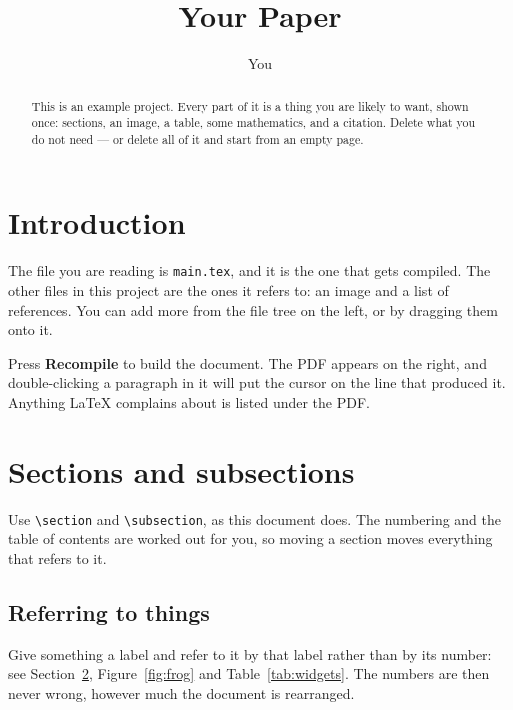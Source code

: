 \documentclass{article}
\title{Your Paper}
\author{You}
\begin{document}
\maketitle

\begin{abstract}
This is an example project. Every part of it is a thing you are likely to
want, shown once: sections, an image, a table, some mathematics, and a
citation. Delete what you do not need --- or delete all of it and start from
an empty page.
\end{abstract}

\section{Introduction}

The file you are reading is \verb|main.tex|, and it is the one that gets
compiled. The other files in this project are the ones it refers to: an image
and a list of references. You can add more from the file tree on the left, or
by dragging them onto it.

Press \textbf{Recompile} to build the document. The PDF appears on the right,
and double-clicking a paragraph in it will put the cursor on the line that
produced it. Anything LaTeX complains about is listed under the PDF.

\section{Sections and subsections}
\label{sec:sections}

Use \verb|\section| and \verb|\subsection|, as this document does. The
numbering and the table of contents are worked out for you, so moving a
section moves everything that refers to it.

\subsection{Referring to things}

Give something a label and refer to it by that label rather than by its
number: see Section~\ref{sec:sections}, Figure~\ref{fig:frog} and
Table~\ref{tab:widgets}. The numbers are then never wrong, however much the
document is rearranged.
\end{document}
